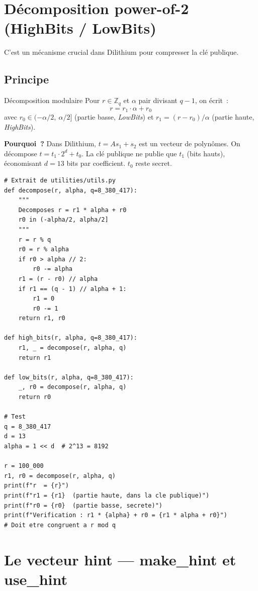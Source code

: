 \documentclass[12pt, a4paper]{article}
\newcommand{\ZZ}{\mathbb{Z}}
\begin{document}
\section{Décomposition power-of-2 (HighBits / LowBits)}

C'est un mécanisme crucial dans Dilithium pour compresser la clé publique.

\subsection{Principe}

\begin{defbox}{Décomposition modulaire}
Pour $r \in \ZZ_q$ et $\alpha$ pair divisant $q - 1$, on écrit~:
$$r = r_1 \cdot \alpha + r_0$$
avec $r_0 \in (- \alpha/2,\ \alpha/2]$ (partie basse, \emph{LowBits})
et $r_1 = (r - r_0) / \alpha$ (partie haute, \emph{HighBits}).
\end{defbox}

\textbf{Pourquoi~?} Dans Dilithium, $t = A s_1 + s_2$ est un vecteur de polynômes.
On décompose $t = t_1 \cdot 2^d + t_0$. La clé publique ne publie que $t_1$
(bits hauts), économisant $d = 13$ bits par coefficient. $t_0$ reste secret.

\begin{lstlisting}[style=python]
# Extrait de utilities/utils.py
def decompose(r, alpha, q=8_380_417):
    """
    Decomposes r = r1 * alpha + r0
    r0 in (-alpha/2, alpha/2]
    """
    r = r % q
    r0 = r % alpha
    if r0 > alpha // 2:
        r0 -= alpha
    r1 = (r - r0) // alpha
    if r1 == (q - 1) // alpha + 1:
        r1 = 0
        r0 -= 1
    return r1, r0

def high_bits(r, alpha, q=8_380_417):
    r1, _ = decompose(r, alpha, q)
    return r1

def low_bits(r, alpha, q=8_380_417):
    _, r0 = decompose(r, alpha, q)
    return r0

# Test
q = 8_380_417
d = 13
alpha = 1 << d  # 2^13 = 8192

r = 100_000
r1, r0 = decompose(r, alpha, q)
print(f"r  = {r}")
print(f"r1 = {r1}  (partie haute, dans la cle publique)")
print(f"r0 = {r0}  (partie basse, secrete)")
print(f"Verification : r1 * {alpha} + r0 = {r1 * alpha + r0}")
# Doit etre congruent a r mod q
\end{lstlisting}

\section{Le vecteur hint --- make\_hint et use\_hint}
\end{document}
